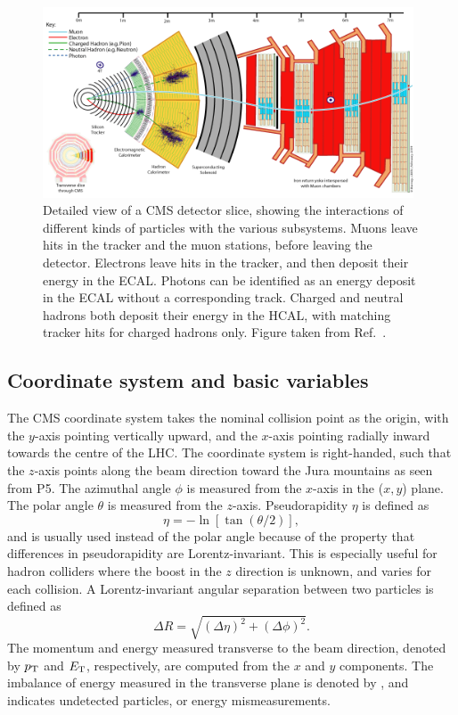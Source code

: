 \begin{figure}[htpb]
  \centering
  \includegraphics[width=0.98\textwidth]{figures/cms/CMS_Slice}
  \caption{Detailed view of a CMS detector slice, showing the interactions of different kinds of
particles with the various subsystems. Muons leave hits in the tracker and the muon stations,
before leaving the detector. Electrons leave hits in the tracker, and then deposit their
energy in the ECAL. Photons can be identified as an energy deposit in the ECAL without a
corresponding track. Charged and neutral hadrons both deposit their energy in the HCAL, with
matching tracker hits for charged hadrons only. 
Figure taken from Ref.~\cite{CMS_slice}.
  \label{fig:cms_slice}}
\end{figure}

\subsection{Coordinate system and basic variables \label{sec:cms_coordinates}}

The CMS coordinate system takes the nominal collision point as the origin, with the $y$-axis
pointing vertically upward, and the $x$-axis pointing radially inward towards the centre of the
LHC. The coordinate system is right-handed, such that the $z$-axis points along the beam direction
toward the Jura mountains as seen from P5. 
The azimuthal angle $\phi$ is measured from the $x$-axis in the ($x,y$) plane. The polar angle
$\theta$ is measured from the $z$-axis. 
Pseudorapidity $\eta$ is defined as 
\begin{equation}
 \eta = - \ln \left[ \tan(\theta/2) \right],  
\end{equation}
and is usually used instead of the
polar angle because of the property that differences in pseudorapidity are
Lorentz-invariant. This is especially useful for hadron colliders where the boost in the $z$
direction is unknown, and varies for each collision. A Lorentz-invariant angular separation between
two particles is defined as 
\begin{equation}
\Delta R = \sqrt{(\Delta\eta)^2 + (\Delta\phi)^2}.
\end{equation}
The momentum and energy measured transverse to the beam direction, denoted by $p_{\mathrm{T}}$ and $E_{\mathrm{T}}$,
respectively, are computed from the $x$ and $y$ components.
The imbalance of energy measured in the transverse plane is denoted by \ETm, and indicates
undetected particles, or energy mismeasurements.
 

